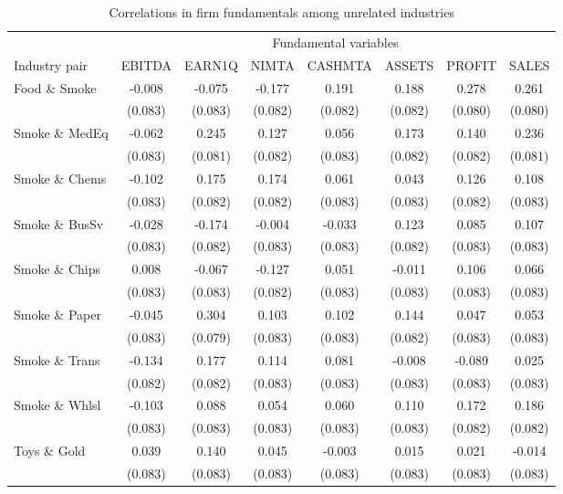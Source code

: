 \begin{table}

\caption{\label{tab:table-oa4}Correlations in firm fundamentals among unrelated industries}
\centering
\begin{tabular}[t]{lccccccc}
\toprule
\multicolumn{1}{c}{ } & \multicolumn{7}{c}{Fundamental variables} \\
\cmidrule(l{3pt}r{3pt}){2-8}
Industry pair & EBITDA & EARN1Q & NIMTA & CASHMTA & ASSETS & PROFIT & SALES\\
\midrule
Food \& Smoke & -0.008 & -0.075 & -0.177 & 0.191 & 0.188 & 0.278 & 0.261\\
 & (0.083) & (0.083) & (0.082) & (0.082) & (0.082) & (0.080) & (0.080)\\
Smoke \& MedEq & -0.062 & 0.245 & 0.127 & 0.056 & 0.173 & 0.140 & 0.236\\
 & (0.083) & (0.081) & (0.082) & (0.083) & (0.082) & (0.082) & (0.081)\\
Smoke \& Chems & -0.102 & 0.175 & 0.174 & 0.061 & 0.043 & 0.126 & 0.108\\
\addlinespace
 & (0.083) & (0.082) & (0.082) & (0.083) & (0.083) & (0.082) & (0.083)\\
Smoke \& BusSv & -0.028 & -0.174 & -0.004 & -0.033 & 0.123 & 0.085 & 0.107\\
 & (0.083) & (0.082) & (0.083) & (0.083) & (0.082) & (0.083) & (0.083)\\
Smoke \& Chips & 0.008 & -0.067 & -0.127 & 0.051 & -0.011 & 0.106 & 0.066\\
 & (0.083) & (0.083) & (0.082) & (0.083) & (0.083) & (0.083) & (0.083)\\
\addlinespace
Smoke \& Paper & -0.045 & 0.304 & 0.103 & 0.102 & 0.144 & 0.047 & 0.053\\
 & (0.083) & (0.079) & (0.083) & (0.083) & (0.082) & (0.083) & (0.083)\\
Smoke \& Trans & -0.134 & 0.177 & 0.114 & 0.081 & -0.008 & -0.089 & 0.025\\
 & (0.082) & (0.082) & (0.083) & (0.083) & (0.083) & (0.083) & (0.083)\\
Smoke \& Whlsl & -0.103 & 0.088 & 0.054 & 0.060 & 0.110 & 0.172 & 0.186\\
\addlinespace
 & (0.083) & (0.083) & (0.083) & (0.083) & (0.083) & (0.082) & (0.082)\\
Toys \& Gold & 0.039 & 0.140 & 0.045 & -0.003 & 0.015 & 0.021 & -0.014\\
 & (0.083) & (0.083) & (0.083) & (0.083) & (0.083) & (0.083) & (0.083)\\

\end{tabular}
\end{table}
